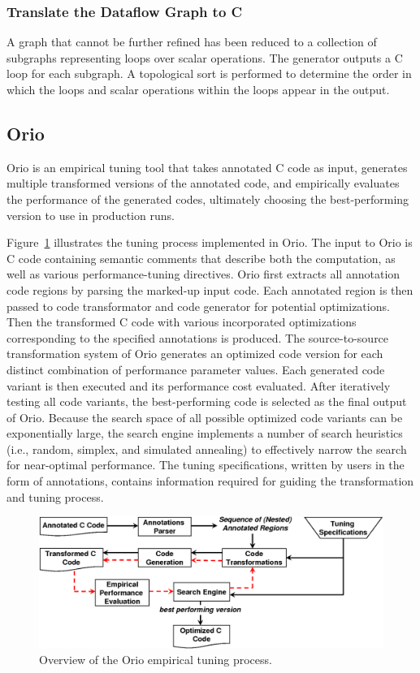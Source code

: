 \documentclass[runningheads]{llncs}
\begin{document}
\subsubsection{Translate the Dataflow Graph to C}

A graph that cannot be further refined has been reduced to a collection of subgraphs representing loops over scalar operations. The generator outputs a C loop for each subgraph.  A topological sort is performed to determine the order in which the loops and scalar operations within the loops appear in the output.
\subsection{Orio}
\label{sec:orio}

Orio is an empirical tuning tool that takes annotated C code as input,
generates multiple transformed versions of the annotated code, and
empirically evaluates the performance of the generated codes,
ultimately choosing the best-performing version to use in production
runs.

Figure~\ref{fig:orio} illustrates the tuning process implemented in
Orio. The input to Orio is C code containing semantic comments that
describe both the computation, as well as various performance-tuning
directives. Orio first extracts all annotation code regions by parsing
the marked-up input code. Each annotated region is then passed to code
transformator and code generator for potential optimizations. Then the
transformed C code with various incorporated optimizations
corresponding to the specified annotations is produced. The
source-to-source transformation system of Orio generates an optimized
code version for each distinct combination of performance parameter
values. Each generated code variant is then executed and its
performance cost evaluated. After iteratively testing all code
variants, the best-performing code is selected as the final output of
Orio. Because the search space of all possible optimized code variants
can be exponentially large, the search engine implements a number of
search heuristics (i.e., random, simplex, and simulated annealing) to
effectively narrow the search for near-optimal performance. The tuning
specifications, written by users in the form of annotations, contains
information required for guiding the transformation and tuning
process.

\begin{figure}[tb]
\vspace{-.1in}
\begin{center}
\includegraphics[width=.65\textwidth]{figures/orio.png}
\end{center}
\vspace{-.25in}
\caption{Overview of the Orio empirical tuning process.}
\label{fig:orio}
\end{figure}
\end{document}
